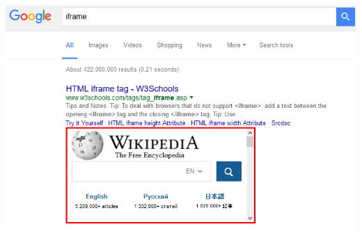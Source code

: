 \documentclass[accentcolor=tud9c,colorbacktitle,xcolor=dvipsnames]{tudbeamer}
\begin{document}
\begin{frame}[plain]
    \includegraphics[scale=0.6]{./graphics/iframe.png}
\end{frame}
\end{document}
